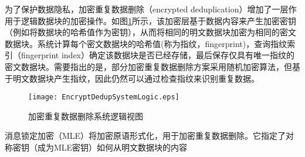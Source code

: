 为了保护数据隐私，加密重复数据删除（encrypted deduplication）增加了一层作用于逻辑数据块的加密操作。如图\ref{fig:加密重复数据删除系统逻辑视图}所示，该加密层基于数据内容来产生加密密钥（例如将数据块的哈希值作为密钥），从而将相同的明文数据块加密为相同的密文数据块。系统计算每个密文数据块的哈希值(称为指纹，fingerprint)，查询指纹索引（fingerprint index）确定该数据块是否已经存储，最后保存仅具有唯一指纹的密文数据块。需要指出的是，部分加密重复数据删除方案采用随机加密算法，但基于明文数据块产生指纹，因此仍然可以通过检查指纹来识别重复数据。

\begin{figure}[!htb]
    \small
    \centering
    \texttt{[image: EncryptDedupSystemLogic.eps]}
    \caption{加密重复数据删除系统逻辑视图}
    \label{fig:加密重复数据删除系统逻辑视图}
\end{figure}

消息锁定加密（MLE）将加密原语形式化，用于加密重复数据删除。它指定了对称密钥（成为MLE密钥）如何从明文数据块的内容






